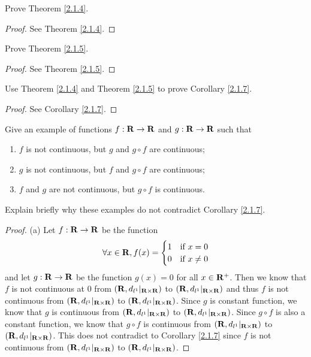 \exercisesection

\begin{exercise}\label{ex 2.1.1}
    Prove Theorem \ref{2.1.4}.
\end{exercise}

\begin{proof}
    See Theorem \ref{2.1.4}.
\end{proof}

\begin{exercise}\label{ex 2.1.2}
    Prove Theorem \ref{2.1.5}.
\end{exercise}

\begin{proof}
    See Theorem \ref{2.1.5}.
\end{proof}

\begin{exercise}\label{ex 2.1.3}
    Use Theorem \ref{2.1.4} and Theorem \ref{2.1.5} to prove Corollary \ref{2.1.7}.
\end{exercise}

\begin{proof}
    See Corollary \ref{2.1.7}.
\end{proof}

\begin{exercise}\label{ex 2.1.4}
    Give an example of functions \(f : \mathbf{R} \to \mathbf{R}\) and \(g : \mathbf{R} \to \mathbf{R}\) such that
    \begin{enumerate}
        \item \(f\) is not continuous, but \(g\) and \(g \circ f\) are continuous;
        \item \(g\) is not continuous, but \(f\) and \(g \circ f\) are continuous;
        \item \(f\) and \(g\) are not continuous, but \(g \circ f\) is continuous.
    \end{enumerate}
    Explain briefly why these examples do not contradict Corollary \ref{2.1.7}.
\end{exercise}

\begin{proof}{(a)}
    Let \(f : \mathbf{R} \to \mathbf{R}\) be the function
    \[
        \forall x \in \mathbf{R}, f(x) = \begin{cases}
            1 & \text{if } x = 0    \\
            0 & \text{if } x \neq 0
        \end{cases}
    \]
    and let \(g : \mathbf{R} \to \mathbf{R}\) be the function \(g(x) = 0\) for all \(x \in \mathbf{R}^+\).
    Then we know that \(f\) is not continuous at \(0\) from \((\mathbf{R}, d_{l^1}|_{\mathbf{R} \times \mathbf{R}})\) to \((\mathbf{R}, d_{l^1}|_{\mathbf{R} \times \mathbf{R}})\) and thus \(f\) is not continuous from \((\mathbf{R}, d_{l^1}|_{\mathbf{R} \times \mathbf{R}})\) to \((\mathbf{R}, d_{l^1}|_{\mathbf{R} \times \mathbf{R}})\).
    Since \(g\) is constant function, we know that \(g\) is continuous from \((\mathbf{R}, d_{l^1}|_{\mathbf{R} \times \mathbf{R}})\) to \((\mathbf{R}, d_{l^1}|_{\mathbf{R} \times \mathbf{R}})\).
    Since \(g \circ f\) is also a constant function, we know that \(g \circ f\) is continuous from \((\mathbf{R}, d_{l^1}|_{\mathbf{R} \times \mathbf{R}})\) to \((\mathbf{R}, d_{l^1}|_{\mathbf{R} \times \mathbf{R}})\).
    This does not contradict to Corollary \ref{2.1.7} since \(f\) is not continuous from \((\mathbf{R}, d_{l^1}|_{\mathbf{R} \times \mathbf{R}})\) to \((\mathbf{R}, d_{l^1}|_{\mathbf{R} \times \mathbf{R}})\).
\end{proof}

